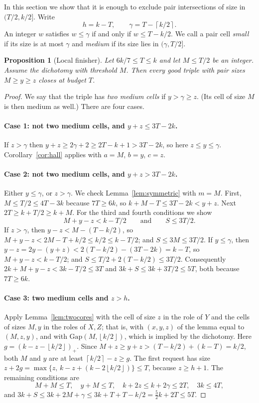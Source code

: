 \documentclass[11pt]{article}
\numberwithin{equation}{section}
\newtheorem{proposition}[theorem]{Proposition}
\theoremstyle{definition}
\theoremstyle{remark}
\newcommand{\ceil}[1]{\left\lceil #1\right\rceil}
\newcommand{\floor}[1]{\left\lfloor #1\right\rfloor}
\newcommand{\Gap}{\mathrm{Gap}}
\begin{document}
In this section we show that it is enough to exclude pair intersections
of size in $(T/2,k/2]$. Write
\[
 h=k-T,\qquad \gamma=T-\ceil{k/2}.
\]
An integer $w$ satisfies $w\le\gamma$ if and only if $w\le T-k/2$. We
call a pair cell \emph{small} if its size is at most $\gamma$ and
\emph{medium} if its size lies in $(\gamma,T/2]$.

\begin{proposition}[Local finisher]\label{prop:localfinish}
Let $6k/7\le T\le k$ and let $M\le T/2$ be an integer. Assume the
dichotomy with threshold $M$. Then every good triple with pair sizes
$M\ge y\ge z$ closes at budget $T$.
\end{proposition}

\begin{proof}
We say that the triple has \emph{two medium cells} if $y>\gamma\ge z$.
(Its cell of size $M$ is then medium as well.) There are four cases.

\paragraph{Case 1: not two medium cells, and $y+z\le3T-2k$.}
If $z>\gamma$ then $y+z\ge2\gamma+2\ge2T-k+1>3T-2k$, so here $z\le y\le\gamma$.
Corollary~\ref{cor:hall} applies with $a=M$, $b=y$, $c=z$.

\paragraph{Case 2: not two medium cells, and $y+z>3T-2k$.}
Either $y\le\gamma$, or $z>\gamma$. We check
Lemma~\ref{lem:symmetric} with $m=M$. First, $M\le T/2\le4T-3k$ because
$7T\ge6k$, so $k+M-T\le3T-2k<y+z$. Next $2T\ge k+T/2\ge k+M$. For the
third and fourth conditions we show
\[
 M+y-z<k-T/2\qquad\text{and}\qquad S\le3T/2 .
\]
If $z>\gamma$, then $y-z<M-(T-k/2)$, so $M+y-z<2M-T+k/2\le k/2\le k-T/2$;
and $S\le3M\le3T/2$. If $y\le\gamma$, then $y-z=2y-(y+z)<2(T-k/2)-(3T-2k)=k-T$,
so $M+y-z<k-T/2$; and $S\le T/2+2(T-k/2)\le3T/2$. Consequently
$2k+M+y-z<3k-T/2\le3T$ and $3k+S\le3k+3T/2\le5T$, both because $7T\ge6k$.

\paragraph{Case 3: two medium cells and $z>h$.}
Apply Lemma~\ref{lem:twocores} with the cell of size $z$ in the role of
$Y$ and the cells of sizes $M,y$ in the roles of $X,Z$; that is, with
$(x,y,z)$ of the lemma equal to $(M,z,y)$, and with $\Gap(M,\floor{k/2})$,
which is implied by the dichotomy. Here $g=(k-z-\floor{k/2})_+$. Since
$M+z\ge y+z>(T-k/2)+(k-T)=k/2$, both $M$ and $y$ are at least
$\ceil{k/2}-z\ge g$. The first request has size
$z+2g=\max\{z,\,k-z+(k-2\floor{k/2})\}\le T$, because $z\ge h+1$. The
remaining conditions are
\[
 M+M\le T,\quad y+M\le T,\quad k+2z\le k+2\gamma\le2T,\quad 3k\le4T,
\]
and $3k+S\le3k+2M+\gamma\le3k+T+T-k/2=\tfrac52k+2T\le5T$.


\end{proof}
\end{document}
